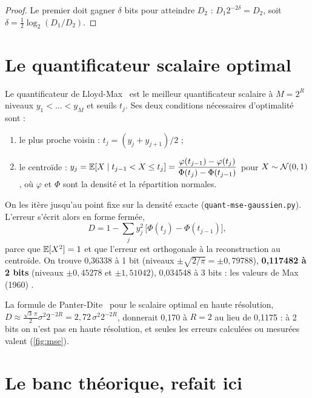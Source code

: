 \begin{proof}
Le premier doit gagner $\delta$ bits pour atteindre $D_2$ : $D_1 2^{-2\delta} = D_2$, soit $\delta = \tfrac12 \log_2(D_1/D_2)$.
\end{proof}

\section{Le quantificateur scalaire optimal}\label{sec:lloyd}

Le quantificateur de Lloyd-Max~\cite{lloyd1982,max1960} est le meilleur quantificateur scalaire à $M = 2^R$ niveaux $y_1 < \dots < y_M$ et seuils $t_j$. Ses deux conditions nécessaires d'optimalité sont :
\begin{enumerate}
\item le plus proche voisin : $t_j = (y_j + y_{j+1})/2$ ;
\item le centroïde : $y_j = \mathbb{E}[X \mid t_{j-1} < X \le t_j] = \dfrac{\varphi(t_{j-1}) - \varphi(t_j)}{\Phi(t_j) - \Phi(t_{j-1})}$ pour $X \sim \mathcal{N}(0,1)$, où $\varphi$ et $\Phi$ sont la densité et la répartition normales.
\end{enumerate}
On les itère jusqu'au point fixe sur la densité exacte (\texttt{quant-mse-gaussien.py}). L'erreur s'écrit alors en forme fermée,
\begin{equation}\label{eq:lloyd-mse}
D = 1 - \sum_j y_j^2 \,\bigl[\Phi(t_j) - \Phi(t_{j-1})\bigr],
\end{equation}
parce que $\mathbb{E}[X^2] = 1$ et que l'erreur est orthogonale à la reconstruction au centroïde. On trouve 0,36338 à 1 bit (niveaux $\pm\sqrt{2/\pi} = \pm 0{,}79788$), \textbf{0,117482 à 2 bits} (niveaux $\pm 0{,}45278$ et $\pm 1{,}51042$), 0,034548 à 3 bits : les valeurs de Max (1960) \calc.

\begin{remarque}
La formule de Panter-Dite~\cite{panter1951} pour le scalaire optimal en haute résolution, $D \approx \tfrac{\sqrt3\,\pi}{2}\sigma^2 2^{-2R} = 2{,}72\,\sigma^2 2^{-2R}$, donnerait 0,170 à $R=2$ au lieu de 0,1175 : à 2 bits on n'est pas en haute résolution, et seules les erreurs calculées ou mesurées valent (\cref{fig:mse}).
\end{remarque}

\section{Le banc théorique, refait ici}\label{sec:banc-mse}

